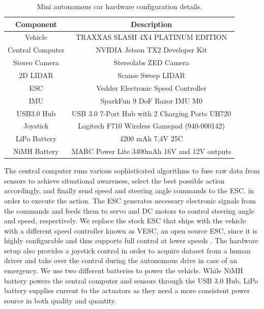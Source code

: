 \begin{table}[h]
  \begin{center}
    \caption[Hardware configuration]{Mini autonomous car hardware configuration
      details.}
    \label{table:hardware-configuration}
    \begin{tabular}{|c|c|}
      \hline
      \textbf{Component} & \textbf{Description} \\
      \hline
      Vehicle            & TRAXXAS SLASH 4X4 PLATINUM EDITION \\ 
      \hline
      Central Computer   & NVIDIA Jetson TX2 Developer Kit \\
      \hline
      Stereo Camera      & Stereolabs ZED Camera \\
      \hline
      2D LIDAR           & Scanse Sweep LIDAR \\
      \hline
      ESC                & Vedder Electronic Speed Controller \\
      \hline
      IMU                & SparkFun 9 DoF Razor IMU M0 \\
      \hline
      USB3.0 Hub         & USB 3.0 7-Port Hub with 2 Charging Ports UH720 \\
      \hline
      Joystick           & Logitech F710 Wireless Gamepad (940-000142) \\
      \hline
      LiPo Battery       & 4200 mAh 7,4V 25C \\
      \hline
      NiMH Battery       & MARC Power Lite 3400mAh 16V and 12V outputs \\
      \hline
    \end{tabular}
  \end{center}
\end{table}

The central computer runs various sophisticated algorithms to fuse raw data
from sensors to achieve situational awareness, select the best possible action
accordingly, and finally send speed and steering angle commands to the ESC.  in
order to execute the action. The ESC generates necessary electronic signals
from the commands and feeds them to servo and DC motors to control steering
angle and speed, respectively. We replace the stock ESC that ships with the
vehicle with a different speed controller known as VESC, an open source ESC,
since it is highly configurable and thus supports full control at lower speeds
\cite{Vesc2015ESC}. The hardware setup also provides a joystick control in
order to acquire dataset from a human driver and take over the control during
the autonomous drive in case of an emergency. We use two different batteries to
power the vehicle.  While NiMH battery powers the central computer and sensors
through the USB 3.0 Hub, LiPo battery supplies current to the actuators as they
need a more consistent power source in both quality and quantity.

